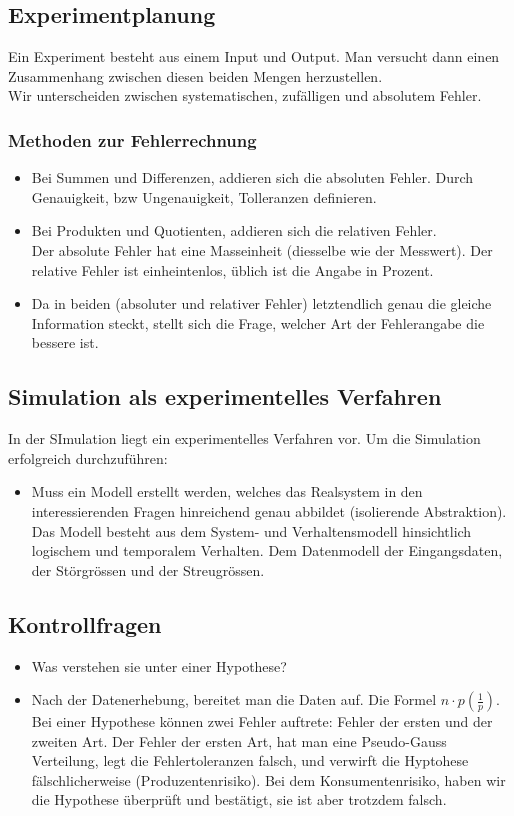 \subsection{Experimentplanung}
Ein Experiment besteht aus einem Input und Output. Man versucht dann einen Zusammenhang zwischen diesen beiden Mengen herzustellen. \\

Wir unterscheiden zwischen systematischen, zufälligen und absolutem Fehler. 
\subsubsection{Methoden zur Fehlerrechnung}
\begin{itemize}
\item Bei Summen und Differenzen, addieren sich die absoluten Fehler. Durch Genauigkeit, bzw Ungenauigkeit, Tolleranzen definieren. 
\item Bei Produkten und Quotienten, addieren sich die relativen Fehler.\\
Der absolute Fehler hat eine Masseinheit (diesselbe wie der Messwert). Der relative Fehler ist einheintenlos, üblich ist die Angabe in Prozent.
\item Da in beiden (absoluter und relativer Fehler) letztendlich genau die gleiche Information steckt, stellt sich die Frage, welcher Art der Fehlerangabe die bessere ist.
\end{itemize}
\subsection{Simulation als experimentelles Verfahren}
In der SImulation liegt ein experimentelles Verfahren vor. Um die Simulation erfolgreich durchzuführen:
\begin{itemize}
\item Muss ein Modell erstellt werden, welches das Realsystem in den interessierenden Fragen hinreichend genau abbildet (isolierende Abstraktion). Das Modell besteht aus dem System- und Verhaltensmodell hinsichtlich logischem und temporalem Verhalten. Dem Datenmodell der Eingangsdaten, der Störgrössen und der Streugrössen.
\end{itemize}
\subsection{Kontrollfragen}
\begin{itemize}
\item Was verstehen sie unter einer Hypothese?
\item Nach der Datenerhebung, bereitet man die Daten auf. Die Formel $n\cdot p \left(\frac{1}{p}\right)$. Bei einer Hypothese können zwei Fehler auftrete: Fehler der ersten und der zweiten Art. Der Fehler der ersten Art, hat man eine Pseudo-Gauss Verteilung, legt die Fehlertoleranzen falsch, und verwirft die Hyptohese fälschlicherweise (Produzentenrisiko). Bei dem Konsumentenrisiko,  haben wir die Hypothese überprüft und bestätigt, sie ist aber trotzdem falsch.
\end{itemize}